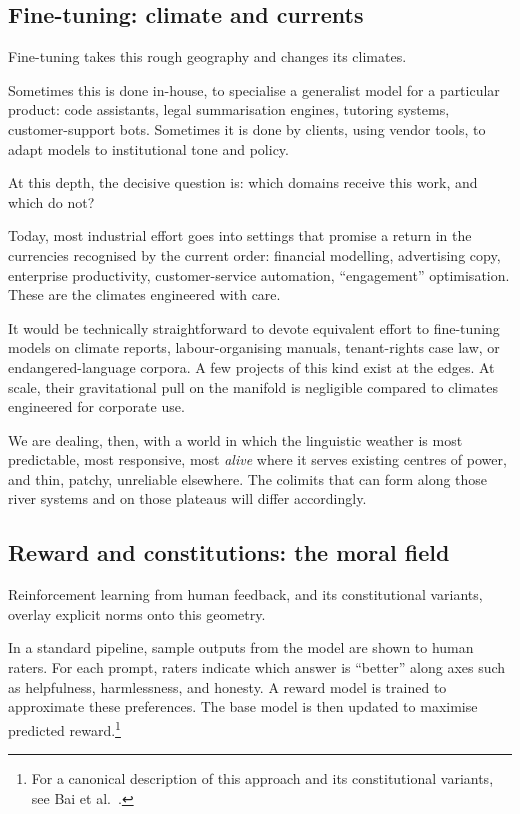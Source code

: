 \subsection{Fine-tuning: climate and currents}

Fine-tuning takes this rough geography and changes its climates.

Sometimes this is done in-house, to specialise a generalist model for a particular product: code assistants, legal summarisation engines, tutoring systems, customer-support bots. Sometimes it is done by clients, using vendor tools, to adapt models to institutional tone and policy.

At this depth, the decisive question is: which domains receive this work, and which do not?

Today, most industrial effort goes into settings that promise a return in the currencies recognised by the current order: financial modelling, advertising copy, enterprise productivity, customer-service automation, ``engagement'' optimisation. These are the climates engineered with care.

It would be technically straightforward to devote equivalent effort to fine-tuning models on climate reports, labour-organising manuals, tenant-rights case law, or endangered-language corpora. A few projects of this kind exist at the edges. At scale, their gravitational pull on the manifold is negligible compared to climates engineered for corporate use.

We are dealing, then, with a world in which the linguistic weather is most predictable, most responsive, most \emph{alive} where it serves existing centres of power, and thin, patchy, unreliable elsewhere. The colimits that can form along those river systems and on those plateaus will differ accordingly.

\subsection{Reward and constitutions: the moral field}

Reinforcement learning from human feedback, and its constitutional variants, overlay explicit norms onto this geometry.

In a standard pipeline, sample outputs from the model are shown to human raters. For each prompt, raters indicate which answer is ``better'' along axes such as helpfulness, harmlessness, and honesty. A reward model is trained to approximate these preferences. The base model is then updated to maximise predicted reward.\footnote{For a canonical description of this approach and its constitutional variants, see Bai et al.\ \cite{bai2022constitutional}.}

